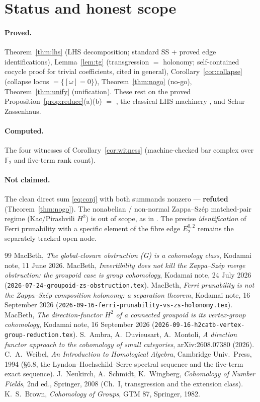 \documentclass[11pt]{article}
\theoremstyle{definition}
\begin{document}
\section{Status and honest scope}
\paragraph{Proved.} Theorem~\ref{thm:lhs} (LHS decomposition; standard SS +
proved edge identifications), Lemma~\ref{lem:tg} (transgression $=$ holonomy;
self-contained cocycle proof for trivial coefficients, cited \cite{nsw} in
general), Corollary~\ref{cor:collapse} (collapse locus $=\{[\omega]=0\}$),
Theorem~\ref{thm:nogo} (no-go), Theorem~\ref{thm:unify} (unification). These rest
on the proved Proposition~\ref{prop:reduce}(a)(b) $=$ \cite{gzs,sep2}, the
classical LHS machinery \cite{weibel,nsw}, and Schur--Zassenhaus.
\paragraph{Computed.} The four witnesses of Corollary~\ref{cor:witness}
(machine-checked bar complex over $\mathbb F_2$ and five-term rank count).
\paragraph{Not claimed.} The clean direct sum \eqref{eq:conj} with both summands
nonzero --- \textbf{refuted} (Theorem~\ref{thm:nogo}). The nonabelian /
non-normal Zappa--Sz\'ep matched-pair regime (Kac/Pirashvili $H^2$) is out of
scope, as in \cite{gzs}. The precise \emph{identification} of Ferri prunability
with a specific element of the fibre edge $E_2^{0,2}$ remains the separately
tracked open node.

\begin{thebibliography}{99}
 MacBeth, \emph{The global-closure obstruction (G) is a
cohomology class}, Kodamai note, 11 June 2026.
 MacBeth, \emph{Invertibility does not kill the Zappa--Sz\'ep merge
obstruction: the groupoid case is group cohomology}, Kodamai note, 24 July 2026
(\texttt{2026-07-24-groupoid-zs-obstruction.tex}).
 MacBeth, \emph{Ferri prunability is not the Zappa--Sz\'ep
composition holonomy: a separation theorem}, Kodamai note, 16 September 2026
(\texttt{2026-09-16-ferri-prunability-vs-zs-holonomy.tex}).
 MacBeth, \emph{The direction-functor $H^2$ of a connected
groupoid is its vertex-group cohomology}, Kodamai note, 16 September 2026
(\texttt{2026-09-16-h2catb-vertex-group-reduction.tex}).
 S.~Ambra, A.~Duvieusart, A.~Montoli, \emph{A direction functor
approach to the cohomology of small categories}, arXiv:2608.07380 (2026).
 C.~A.~Weibel, \emph{An Introduction to Homological Algebra},
Cambridge Univ.\ Press, 1994 (\S6.8, the Lyndon--Hochschild--Serre spectral
sequence and the five-term exact sequence).
 J.~Neukirch, A.~Schmidt, K.~Wingberg, \emph{Cohomology of Number
Fields}, 2nd ed., Springer, 2008 (Ch.~I, transgression and the extension class).
 K.~S.~Brown, \emph{Cohomology of Groups}, GTM 87, Springer, 1982.
\end{thebibliography}
\end{document}
